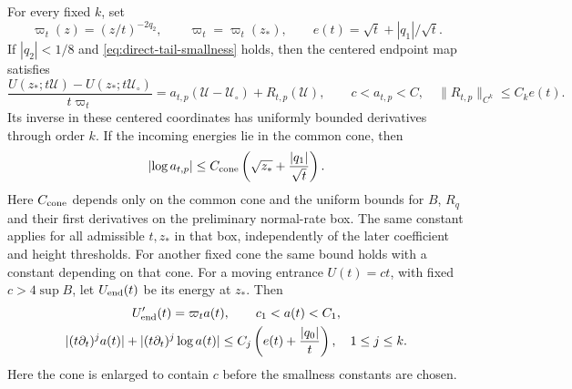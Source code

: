 \begin{lemma}
\label{lem:direct-weighted-tail}
For every fixed \(k\), set
\[
 \varpi_t(z)=(z/t)^{-2q_2},\qquad \varpi_t=\varpi_t(z_*),\qquad
 e(t)=\sqrt t+|q_1|/\sqrt t .
\]
If \(|q_2|<1/8\) and \eqref{eq:direct-tail-smallness} holds, then
the centered endpoint map satisfies
\begin{equation}
\label{eq:direct-centered-tail}
 \frac{U(z_*;t\mathcal U)-U(z_*;t\mathcal U_\circ)}{t\varpi_t}
 =a_{t,p}(\mathcal U-\mathcal U_\circ)+R_{t,p}(\mathcal U),\qquad
 c<a_{t,p}<C,\quad \|R_{t,p}\|_{C^k}\le C_ke(t).
\end{equation}
Its inverse in these centered coordinates has uniformly bounded
derivatives through order \(k\). If the incoming energies lie in the
common cone, then
\begin{equation}
\label{eq:direct-tail-first-slope}
 \left|\log a_{t,p}\right|
       \le C_{\rm cone}\left(\sqrt{z_*}+\frac{|q_1|}{\sqrt t}\right).
\end{equation}
Here \(C_{\rm cone}\) depends only on the common cone and the
uniform bounds for \(B\), \(R_q\) and their first derivatives
on the preliminary normal-rate box. The same constant applies
for all admissible \(t,z_*\) in that box, independently of the
later coefficient and height thresholds. For another fixed cone
the same bound holds with a constant depending on that cone.
For a moving entrance \(U(t)=ct\), with fixed
\(c>4\sup B\), let \(U_{\rm end}(t)\) be its energy at \(z_*\).
Then
\begin{equation}
\label{eq:direct-moving-tail}
 \begin{gathered}
 U_{\rm end}'(t)=\varpi_t a(t),\qquad
 c_1<a(t)<C_1,\\
 |(t\partial_t)^j a(t)|+|(t\partial_t)^j\log a(t)|
 \le C_j\left(e(t)+\frac{|q_0|}{t}\right),\quad 1\le j\le k .
 \end{gathered}
\end{equation}
Here the cone is enlarged to contain \(c\) before the smallness
constants are chosen.
\end{lemma}


